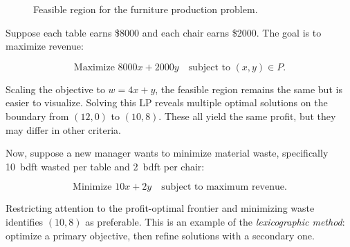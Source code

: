 \begin{figure}[h]
    \centering
    
    \caption{Feasible region for the furniture production problem.}
\end{figure}

Suppose each table earns \$8000 and each chair earns \$2000. The goal is to maximize revenue:

\[
\text{Maximize } 8000x + 2000y \quad \text{subject to } (x, y) \in P.
\]

Scaling the objective to \(w = 4x + y\), the feasible region remains the same but is easier to visualize. Solving this LP reveals multiple optimal solutions on the boundary from \((12, 0)\) to \((10, 8)\). These all yield the same profit, but they may differ in other criteria.

Now, suppose a new manager wants to minimize material waste, specifically 10~bdft wasted per table and 2~bdft per chair:

\[
\text{Minimize } 10x + 2y \quad \text{subject to maximum revenue}.
\]

Restricting attention to the profit-optimal frontier and minimizing waste identifies \((10, 8)\) as preferable. This is an example of the \emph{lexicographic method}: optimize a primary objective, then refine solutions with a secondary one.

